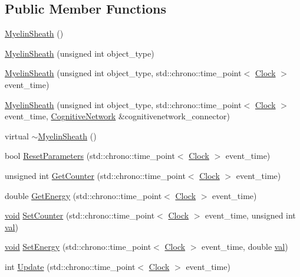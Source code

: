 \subsection*{Public Member Functions}
\begin{DoxyCompactItemize}
\item 
\mbox{\hyperlink{class_myelin_sheath_a298d69acb8d64de018f32443ea015287}{Myelin\+Sheath}} ()
\item 
\mbox{\hyperlink{class_myelin_sheath_a9f9f90c853f341b5cbf4f2c5035a14af}{Myelin\+Sheath}} (unsigned int object\+\_\+type)
\item 
\mbox{\hyperlink{class_myelin_sheath_a34a80a57ebcde58933a07ca9d99780eb}{Myelin\+Sheath}} (unsigned int object\+\_\+type, std\+::chrono\+::time\+\_\+point$<$ \mbox{\hyperlink{universe_8h_a0ef8d951d1ca5ab3cfaf7ab4c7a6fd80}{Clock}} $>$ event\+\_\+time)
\item 
\mbox{\hyperlink{class_myelin_sheath_aac107d8f22ca3c02f2d346f44950e6d0}{Myelin\+Sheath}} (unsigned int object\+\_\+type, std\+::chrono\+::time\+\_\+point$<$ \mbox{\hyperlink{universe_8h_a0ef8d951d1ca5ab3cfaf7ab4c7a6fd80}{Clock}} $>$ event\+\_\+time, \mbox{\hyperlink{class_cognitive_network}{Cognitive\+Network}} \&cognitivenetwork\+\_\+connector)
\item 
virtual \mbox{\hyperlink{class_myelin_sheath_acf71a2a450e2df353f28eed6c7a4129a}{$\sim$\+Myelin\+Sheath}} ()
\item 
bool \mbox{\hyperlink{class_myelin_sheath_af1174b93be36aa43506a4ba9857d92a4}{Reset\+Parameters}} (std\+::chrono\+::time\+\_\+point$<$ \mbox{\hyperlink{universe_8h_a0ef8d951d1ca5ab3cfaf7ab4c7a6fd80}{Clock}} $>$ event\+\_\+time)
\item 
unsigned int \mbox{\hyperlink{class_myelin_sheath_a10eef8601d129e7e2f28e8ed1ebc975c}{Get\+Counter}} (std\+::chrono\+::time\+\_\+point$<$ \mbox{\hyperlink{universe_8h_a0ef8d951d1ca5ab3cfaf7ab4c7a6fd80}{Clock}} $>$ event\+\_\+time)
\item 
double \mbox{\hyperlink{class_myelin_sheath_ac0c4142b6066e5982c54583e8ac01271}{Get\+Energy}} (std\+::chrono\+::time\+\_\+point$<$ \mbox{\hyperlink{universe_8h_a0ef8d951d1ca5ab3cfaf7ab4c7a6fd80}{Clock}} $>$ event\+\_\+time)
\item 
\mbox{\hyperlink{glad_8h_a950fc91edb4504f62f1c577bf4727c29}{void}} \mbox{\hyperlink{class_myelin_sheath_afb9cd377a71881558f48cf8bb226af77}{Set\+Counter}} (std\+::chrono\+::time\+\_\+point$<$ \mbox{\hyperlink{universe_8h_a0ef8d951d1ca5ab3cfaf7ab4c7a6fd80}{Clock}} $>$ event\+\_\+time, unsigned int \mbox{\hyperlink{glad_8h_a26942fd2ed566ef553eae82d2c109c8f}{val}})
\item 
\mbox{\hyperlink{glad_8h_a950fc91edb4504f62f1c577bf4727c29}{void}} \mbox{\hyperlink{class_myelin_sheath_ad0f6dbae2819f6642a92b8e85ec8f775}{Set\+Energy}} (std\+::chrono\+::time\+\_\+point$<$ \mbox{\hyperlink{universe_8h_a0ef8d951d1ca5ab3cfaf7ab4c7a6fd80}{Clock}} $>$ event\+\_\+time, double \mbox{\hyperlink{glad_8h_a26942fd2ed566ef553eae82d2c109c8f}{val}})
\item 
int \mbox{\hyperlink{class_myelin_sheath_af53c8f36ee963168dec09b74a6be8e4c}{Update}} (std\+::chrono\+::time\+\_\+point$<$ \mbox{\hyperlink{universe_8h_a0ef8d951d1ca5ab3cfaf7ab4c7a6fd80}{Clock}} $>$ event\+\_\+time)
\end{DoxyCompactItemize}
